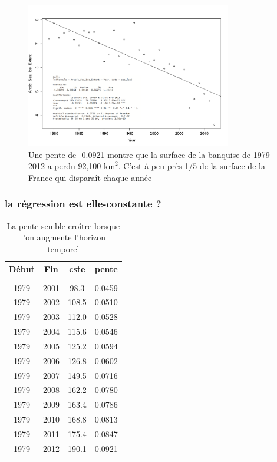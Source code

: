 \begin{frame}
\begin{figure}
  \centering
  \includegraphics[width=0.8\textwidth]{sea_ice_over}
\caption{Une pente de -0.0921 montre que la surface de la banquise de 1979-2012 a perdu 92,100 $\mathrm{km}^2$. C'est à peu près 1/5 de la surface de la France qui disparaît chaque année}
\end{figure}
\end{frame}

\begin{frame}
\frametitle{la régression est elle-constante ?}
\begin{table}
\begin{tabular}{c|c|c|c}
Début & Fin & cste  & pente \\ \hline \hline\\
1979 &2001&98.3&0.0459\\
1979 &2002&108.5&0.0510\\
1979 &2003 &112.0&0.0528\\
1979 &2004 &115.6&0.0546\\
1979 &2005 &125.2&0.0594\\
1979 &2006 &126.8&0.0602 \\
1979 &2007 &149.5&0.0716 \\
1979 &2008 &162.2&0.0780 \\
1979 &2009 &163.4&0.0786 \\
1979 &2010 &168.8&0.0813 \\
1979 &2011 &175.4&0.0847 \\
1979 &2012 &190.1&0.0921 \\
\end{tabular}
\caption{La pente semble croître lorsque l'on augmente l'horizon temporel}
\end{table}
\end{frame}

